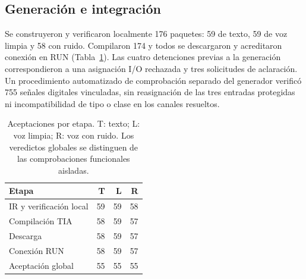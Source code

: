 \documentclass[a4paper,fleqn]{cas-dc}
\begin{document}
\subsection{Generación e integración}
Se construyeron y verificaron localmente 176 paquetes: 59 de texto, 59 de voz limpia y 58 con ruido. Compilaron 174 y todos se descargaron y acreditaron conexión en RUN (Tabla~\ref{tab:etapas_modalidades}). Las cuatro detenciones previas a la generación correspondieron a una asignación I/O rechazada y tres solicitudes de aclaración. Un procedimiento automatizado de comprobación separado del generador verificó 755 señales digitales vinculadas, sin reasignación de las tres entradas protegidas ni incompatibilidad de tipo o clase en los canales resueltos.
\begin{table}[t]
\caption{Aceptaciones por etapa. T: texto; L: voz limpia; R: voz con ruido. Los veredictos globales se distinguen de las comprobaciones funcionales aisladas.}
\label{tab:etapas_modalidades}
\small
\begin{tabularx}{\linewidth}{@{}X r r r@{}}
\toprule Etapa & T & L & R\\ \midrule
IR y verificación local & 59 & 59 & 58\\
Compilación TIA & 58 & 59 & 57\\
Descarga & 58 & 59 & 57\\
Conexión RUN & 58 & 59 & 57\\
Aceptación global & 55 & 55 & 55\\
\bottomrule
\end{tabularx}
\end{table}
\end{document}
